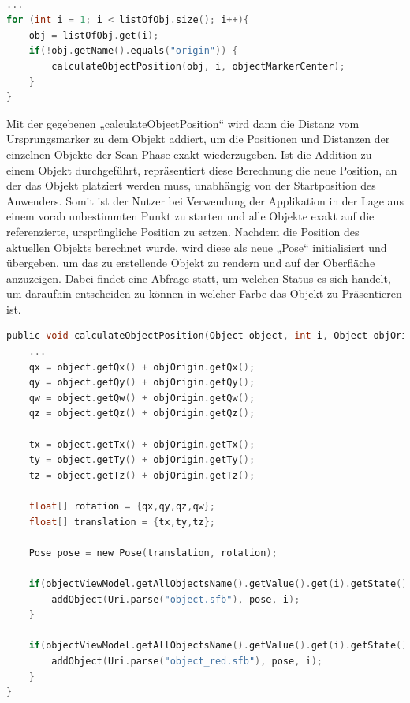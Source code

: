 \\ 
\linebreak
\begin{lstlisting}[language=C,
    frame=lines,           % Ein Rahmen um den Code (single for box, lines for top and bottom)
    xleftmargin=\parindent,  % Rahmen link von den Zahlen
    style=algoBericht,
    label={code:listOfObjects},
    captionpos=b,           % Caption unter den Code setzen
caption={Abfolge der Objekte in der Liste}]
... 
for (int i = 1; i < listOfObj.size(); i++){
    obj = listOfObj.get(i);
    if(!obj.getName().equals("origin")) {
        calculateObjectPosition(obj, i, objectMarkerCenter);
    }
}
\end{lstlisting}
Mit der gegebenen „calculateObjectPosition“ wird dann die Distanz vom Ursprungsmarker zu dem Objekt addiert, um 
die Positionen und Distanzen der einzelnen Objekte der Scan-Phase exakt wiederzugeben. Ist die Addition zu einem Objekt durchgeführt, repräsentiert diese 
Berechnung die neue Position, an der das Objekt platziert werden muss, unabhängig von der Startposition des Anwenders. Somit ist der Nutzer bei Verwendung der 
Applikation in der Lage aus einem vorab unbestimmten Punkt zu starten und alle Objekte exakt auf die referenzierte, ursprüngliche Position zu setzen. Nachdem 
die Position des aktuellen Objekts berechnet wurde, wird diese als neue „Pose“ initialisiert und übergeben, um das zu erstellende Objekt zu rendern und auf der 
Oberfläche anzuzeigen. Dabei findet eine Abfrage statt, um welchen Status es sich handelt, um daraufhin entscheiden zu können in welcher Farbe das Objekt zu 
Präsentieren ist.  
\\ 
\linebreak
\begin{lstlisting}[language=C,
    frame=lines,           % Ein Rahmen um den Code (single for box, lines for top and bottom)
    xleftmargin=\parindent,  % Rahmen link von den Zahlen
    style=algoBericht,
    label={code:additionOfObject},
    captionpos=b,           % Caption unter den Code setzen
caption={Berechnung der Markerplatzierung}]
public void calculateObjectPosition(Object object, int i, Object objOrigin){
    ... 
    qx = object.getQx() + objOrigin.getQx();
    qy = object.getQy() + objOrigin.getQy();
    qw = object.getQw() + objOrigin.getQw();
    qz = object.getQz() + objOrigin.getQz();

    tx = object.getTx() + objOrigin.getTx();
    ty = object.getTy() + objOrigin.getTy();
    tz = object.getTz() + objOrigin.getTz();

    float[] rotation = {qx,qy,qz,qw};
    float[] translation = {tx,ty,tz};

    Pose pose = new Pose(translation, rotation);

    if(objectViewModel.getAllObjectsName().getValue().get(i).getState() == 1) {
        addObject(Uri.parse("object.sfb"), pose, i);
    }

    if(objectViewModel.getAllObjectsName().getValue().get(i).getState() == -1){
        addObject(Uri.parse("object_red.sfb"), pose, i);
    }
}
\end{lstlisting}
